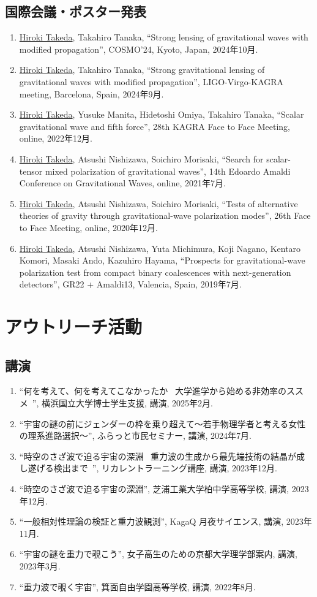\documentclass[uplatex, 11pt]{jsarticle}
\begin{document}
\subsection*{国際会議・ポスター発表}
\begin{enumerate}
\item \uline{Hiroki Takeda}, Takahiro Tanaka, “Strong lensing of gravitational waves with modified propagation”, COSMO'24, Kyoto, Japan, 2024年10月.
\item \uline{Hiroki Takeda}, Takahiro Tanaka, “Strong gravitational lensing of gravitational waves with modified propagation”, LIGO-Virgo-KAGRA meeting, Barcelona, Spain, 2024年9月.
\item \uline{Hiroki Takeda}, Yusuke Manita, Hidetoshi Omiya, Takahiro Tanaka, “Scalar gravitational wave and fifth force”, 28th KAGRA Face to Face Meeting, online, 2022年12月.
\item \uline{Hiroki Takeda}, Atsushi Nishizawa, Soichiro Morisaki, “Search for scalar-tensor mixed polarization of gravitational waves”, 14th Edoardo Amaldi Conference on Gravitational Waves, online, 2021年7月.
\item \uline{Hiroki Takeda}, Atsushi Nishizawa, Soichiro Morisaki, “Tests of alternative theories of gravity through gravitational-wave polarization modes”, 26th Face to Face Meeting, online, 2020年12月.
\item \uline{Hiroki Takeda}, Atsushi Nishizawa, Yuta Michimura, Koji Nagano, Kentaro Komori, Masaki Ando, Kazuhiro Hayama, “Prospects for gravitational-wave polarization test from compact binary coalescences with next-generation detectors”, GR22 + Amaldi13, Valencia, Spain, 2019年7月.
\end{enumerate}


\section*{アウトリーチ活動}
\subsection*{講演}
\begin{enumerate}
\item “何を考えて、何を考えてこなかったか ~大学進学から始める非効率のススメ~”, 横浜国立大学博士学生支援, 講演, 2025年2月.
\item “宇宙の謎の前にジェンダーの枠を乗り超えて〜若手物理学者と考える女性の理系進路選択〜”, ふらっと市民セミナー, 講演, 2024年7月.
\item “時空のさざ波で迫る宇宙の深淵 ~重力波の生成から最先端技術の結晶が成し遂げる検出まで~”, リカレントラーニング講座, 講演, 2023年12月.
\item “時空のさざ波で迫る宇宙の深淵”, 芝浦工業大学柏中学高等学校, 講演, 2023年12月.
\item “一般相対性理論の検証と重力波観測”, KagaQ 月夜サイエンス, 講演, 2023年11月.
\item “宇宙の謎を重力で覗こう”, 女子高生のための京都大学理学部案内, 講演, 2023年3月.
\item “重力波で覗く宇宙”, 箕面自由学園高等学校, 講演, 2022年8月.
\end{enumerate}
\end{document}
